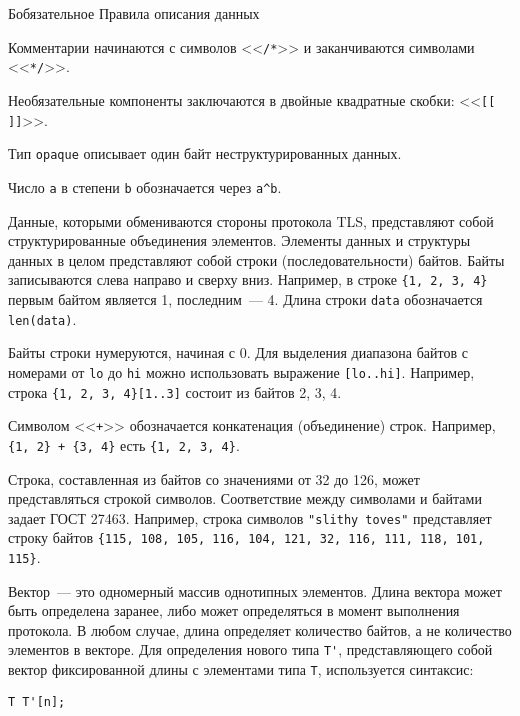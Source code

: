 \begin{appendix}{Б}{обязательное}
{Правила описания данных}
\label{SYNTAX}

\label{SYNTAX.1}

Комментарии начинаются с символов <<\lstinline{/*}>> 
и заканчиваются символами <<\lstinline{*/}>>.

Необязательные компоненты заключаются в двойные квадратные скобки: 
<<\lstinline{[[ ]]}>>.

Тип \lstinline{opaque} описывает один байт неструктурированных данных.

Число \lstinline{a} в степени \lstinline{b} обозначается через
\lstinline{a^b}.

\label{SYNTAX.2}

Данные, которыми обмениваются стороны протокола TLS, представляют собой 
структурированные объединения элементов. Элементы данных и структуры 
данных в целом представляют собой строки (последовательности) байтов. 
Байты записываются слева направо и сверху вниз. Например, в строке 
\lstinline|{1, 2, 3, 4}| первым байтом является 1, последним~--- 4. 
Длина строки \lstinline|data| обозначается \lstinline{len(data)}. 

Байты строки нумеруются, начиная с 0. Для выделения диапазона байтов с 
номерами от \lstinline|lo| до \lstinline|hi| можно использовать выражение 
\lstinline|[lo..hi]|. Например, строка \lstinline|{1, 2, 3, 4}[1..3]| 
состоит из байтов 2, 3, 4.  

Символом <<\lstinline|+|>> обозначается конкатенация (объединение) строк. 
Например, \lstinline|{1, 2} + {3, 4}| есть \lstinline|{1, 2, 3, 4}|. 

Строка, составленная из байтов со значениями от 32 до 126, может 
представляться строкой символов. Соответствие между символами и байтами 
задает ГОСТ 27463.  Например, строка символов \lstinline|"slithy toves"| 
представляет строку байтов 
\lstinline|{115, 108, 105, 116, 104, 121, 32, 116, 111, 118, 101, 115}|.  

\label{SYNTAX.3}

Вектор~--- это одномерный массив однотипных элементов. Длина вектора может 
быть определена заранее, либо может определяться в момент выполнения 
протокола. В любом случае, длина определяет количество байтов, а не 
количество элементов в векторе. Для определения нового типа \lstinline{T'}, 
представляющего собой вектор фиксированной длины с элементами типа 
\lstinline{T}, используется синтаксис: 
\begin{lstlisting}
T T'[n];
\end{lstlisting}


\end{appendix}
